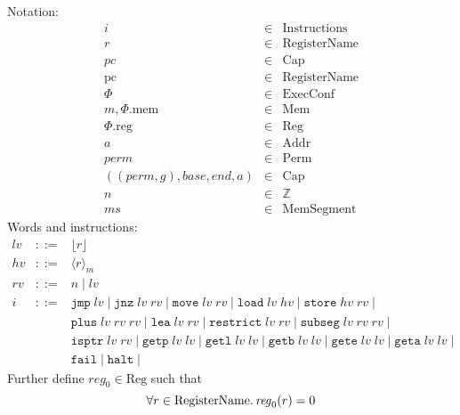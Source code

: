 \documentclass[a4paper]{article}
\newcommand{\var}[1]{\mathit{#1}}
\newcommand{\hs}{\var{ms}}
\newcommand{\ms}{\hs}
\newcommand{\hv}{\var{hv}}
\newcommand{\rv}{\var{rv}}
\newcommand{\lv}{\var{lv}}
\newcommand{\gl}{\var{g}}
\newcommand{\pc}{\mathit{pc}}
\newcommand{\pcreg}{\mathrm{pc}}
\newcommand{\addr}{\var{a}}
\newcommand{\start}{\var{base}}
\newcommand{\addrend}{\var{end}}
\newcommand{\reg}{\var{reg}}
\newcommand{\perm}{\var{perm}}
\newcommand{\plainproj}[1]{\mathrm{#1}}
\newcommand{\memheap}[1][\Phi]{#1.\plainproj{mem}}
\newcommand{\memreg}[1][\Phi]{#1.\plainproj{reg}}
\newcommand{\plaindom}[1]{\mathrm{#1}}
\newcommand{\Caps}{\plaindom{Cap}}
\newcommand{\Addrs}{\plaindom{Addr}}
\newcommand{\ExecConfs}{\plaindom{ExecConf}}
\newcommand{\RegName}{\plaindom{RegisterName}}
\newcommand{\Regs}{\plaindom{Reg}}
\newcommand{\Heaps}{\plaindom{Mem}}
\newcommand{\HeapSegments}{\plaindom{MemSegment}}
\newcommand{\MemSegments}{\HeapSegments}
\newcommand{\Instrs}{\plaindom{Instructions}}
\newcommand{\ints}{\mathbb{Z}}
\newcommand{\Perms}{\plaindom{Perm}}
\newcommand{\refreg}[1]{\lfloor #1 \rfloor}
\newcommand{\refheap}[1]{\langle #1 \rangle_m}
\newcommand{\zinstr}[1]{\mathtt{#1}}
\newcommand{\fail}{\zinstr{fail}}
\newcommand{\halt}{\zinstr{halt}}
\newcommand{\oneinstr}[2]{\zinstr{#1} \; #2}
\newcommand{\jmp}[1]{\oneinstr{jmp}{#1}}
\newcommand{\twoinstr}[3]{\zinstr{#1} \; #2 \; #3}
\newcommand{\restricttwo}[2]{\twoinstr{restrict}{#1}{#2}}
\newcommand{\jnz}[2]{\twoinstr{jnz}{#1}{#2}}
\newcommand{\isptr}[2]{\twoinstr{isptr}{#1}{#2}}
\newcommand{\geta}[2]{\twoinstr{geta}{#1}{#2}}
\newcommand{\getb}[2]{\twoinstr{getb}{#1}{#2}}
\newcommand{\gete}[2]{\twoinstr{gete}{#1}{#2}}
\newcommand{\getp}[2]{\twoinstr{getp}{#1}{#2}}
\newcommand{\getl}[2]{\twoinstr{getl}{#1}{#2}}
\newcommand{\move}[2]{\twoinstr{move}{#1}{#2}}
\newcommand{\store}[2]{\twoinstr{store}{#1}{#2}}
\newcommand{\load}[2]{\twoinstr{load}{#1}{#2}}
\newcommand{\lea}[2]{\twoinstr{lea}{#1}{#2}}
\newcommand{\threeinstr}[4]{\zinstr{#1} \; #2 \; #3 \; #4}
\newcommand{\subseg}[3]{\threeinstr{subseg}{#1}{#2}{#3}}
\newcommand{\plus}[3]{\threeinstr{plus}{#1}{#2}{#3}}
\begin{document}
Notation:
\[
  \begin{array}{rcl}
    i       &\in& \Instrs \\
    r       &\in& \RegName\\
    \pc     &\in& \Caps \\
    \pcreg  &\in& \RegName \\
    \Phi    &\in& \ExecConfs \\
    m, \memheap&\in& \Heaps \\
    \memreg &\in& \Regs \\
    \addr   &\in& \Addrs\\
    \perm   &\in& \Perms\\
    ((\perm,\gl),\start,\addrend,\addr) &\in& \Caps \\
    n       &\in& \ints\\
    \ms     &\in& \MemSegments
  \end{array}
\]
Words and instructions:
\[
  \begin{array}{rcl}
    \lv    &::=& \refreg{r} \\
    \hv    &::=& \refheap{r}\\
    \rv    &::=& n \mid \lv \\
    i      &::=& 
                 \jmp{\lv} \mid 
                 \jnz{\lv}{\rv} \mid
                 \move{\lv}{\rv} \mid 
                 \load{\lv}{\hv} \mid 
                 \store{\hv}{\rv} \mid  \\
           &   & \plus{\lv}{\rv}{\rv} \mid 
                 \lea{\lv}{\rv} \mid 
                 \restricttwo{\lv}{\rv} \mid 
                 \subseg{\lv}{\rv}{\rv} \mid  \\
           &   & \isptr{\lv}{\rv} \mid 
                 \getp{\lv}{\lv} \mid 
                 \getl{\lv}{\lv} \mid 
                 \getb{\lv}{\lv} \mid
                 \gete{\lv}{\lv} \mid
                 \geta{\lv}{\lv} \mid \\
           &   & \fail \mid
                 \halt \mid 
  \end{array}
\]
Further define $\reg_0 \in \Regs$ such that
\[
  \forall r \in \RegName \ldotp \reg_0(r) = 0
\]
\end{document}
